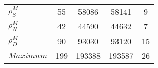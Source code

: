 \begin{center}
\begin{longtable}{lcccc}
$ {\rho^{M}_{S}}       $	 & 	                   55	 & 	                58086	 & 	                58141	 & 	                    9 \\ 
$ {\rho^{M}_{N}}       $	 & 	                   42	 & 	                44590	 & 	                44632	 & 	                    7 \\ 
$ {\rho^{M}_{D}}       $	 & 	                   90	 & 	                93030	 & 	                93120	 & 	                   15 \\ 
$Maximum               $	 & 	                  199	 & 	               193388	 & 	               193587	 & 	                   26 \\ 
\end{longtable}
 \end{center}
